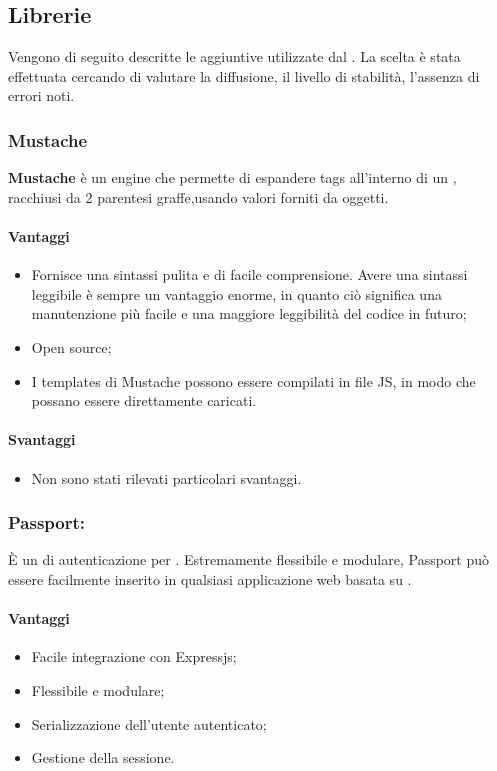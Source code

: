 \subsection{Librerie}
Vengono di seguito descritte le  aggiuntive utilizzate dal . La scelta è stata effettuata cercando di valutare la diffusione, il livello di stabilità, l'assenza di errori noti.

	\subsubsection{Mustache}
\textbf{Mustache} è un  engine che permette di espandere tags all'interno di un , racchiusi da 2 parentesi graffe,usando valori forniti da oggetti.

	\paragraph{Vantaggi}
\begin{itemize}
	\item Fornisce una sintassi pulita e di facile comprensione. Avere una sintassi leggibile è sempre un vantaggio enorme, in quanto ciò significa una manutenzione più facile e una maggiore leggibilità del codice in futuro;
	\item Open source;
	\item I templates di Mustache possono essere compilati in file JS, in modo che possano essere direttamente caricati.
\end{itemize}	

	\paragraph{Svantaggi}
	\begin{itemize}
	\item Non sono stati rilevati particolari svantaggi.
	\end{itemize}
	
	


	\subsubsection{Passport:} \label{passport} È un  di autenticazione per . Estremamente flessibile e modulare, Passport può essere facilmente inserito in qualsiasi applicazione web basata su .
	\paragraph{Vantaggi}
	\begin{itemize}
	\item Facile integrazione con Expressjs;
	\item Flessibile e modulare;
	\item Serializzazione dell'utente autenticato;
	\item Gestione della sessione.
	\end{itemize}
	
